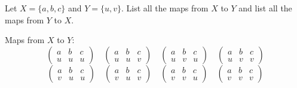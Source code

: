 \begin{exercise}
    Let \(X = \{a, b, c\}\) and \(Y = \{u, v\}\). List all the maps from \(X\) to \(Y\) and list all the maps from \(Y\) to \(X\).
\end{exercise}
\begin{solution}
    Maps from \(X\) to \(Y\):
    \[\begin{pmatrix}
            a & b & c \\
            u & u & u
        \end{pmatrix} \quad
        \begin{pmatrix}
            a & b & c \\
            u & u & v
        \end{pmatrix} \quad
        \begin{pmatrix}
            a & b & c \\
            u & v & u
        \end{pmatrix} \quad
        \begin{pmatrix}
            a & b & c \\
            u & v & v
        \end{pmatrix}\]
    \[\begin{pmatrix}
            a & b & c \\
            v & u & u
        \end{pmatrix} \quad
        \begin{pmatrix}
            a & b & c \\
            v & u & v
        \end{pmatrix} \quad
        \begin{pmatrix}
            a & b & c \\
            v & v & u
        \end{pmatrix} \quad
        \begin{pmatrix}
            a & b & c \\
            v & v & v
        \end{pmatrix}\]


\end{solution}
